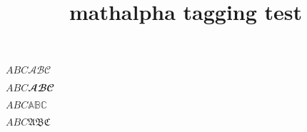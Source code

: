 \documentclass{article}
\title{mathalpha tagging test}
\begin{document}
$ABC\mathcal{ABC}$

$ABC\mathbfcal{ABC}$

$ABC\mathbb{ABC}$

$ABC\mathfrak{ABC}$
\end{document}

